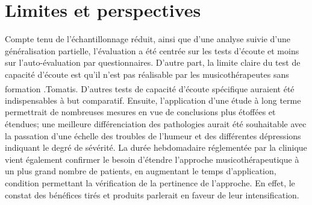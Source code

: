 \section{Limites et perspectives}
Compte tenu  de l'échantillonnage réduit, ainsi que d'une analyse
suivie d'une généralisation partielle, l'évaluation a été centrée sur les
tests d'écoute et moins sur
l'auto-évaluation par questionnaires.
D'autre part, la limite claire du test de capacité d'écoute est qu'il n'est pas réalisable par les 
musicothérapeutes sans formation \textsuperscript \textregistered.Tomatis.
 	D'autres tests de capacité d'écoute spécifique 
auraient été indispensables à but
comparatif.
Ensuite, l'application d'une étude à long terme permettrait  de nombreuses
mesures en vue de conclusions plus étoffées et étendues;  
une meilleure différenciation des pathologies aurait été souhaitable avec la 
passation d'une échelle des troubles de l'humeur et des différentes
dépressions indiquant le degré de sévérité.
La durée hebdomadaire réglementée par la clinique vient également 
confirmer le besoin d'étendre l'approche musicothérapeutique à
un plus grand nombre de patients, en augmentant le temps
d'application, condition permettant la vérification de la
pertinence de l'approche. En effet, le constat des bénéfices
tirés et
produits parlerait en faveur de leur intensification.


